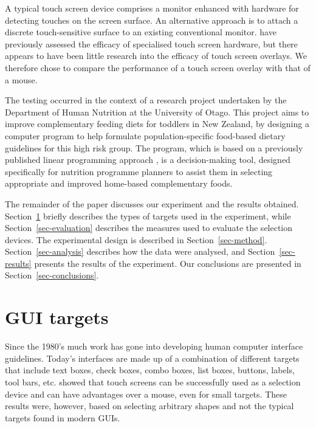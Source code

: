 \documentclass[a4paper]{article}
\begin{document}
A typical touch screen device comprises a monitor enhanced with hardware
for detecting touches on the screen surface. An alternative approach is
to attach a discrete touch-sensitive surface to an existing conventional
monitor. \citet{Sear-A-1991-IJMMS} have previously assessed the efficacy
of specialised touch screen hardware, but there appears to have been
little research into the efficacy of touch screen overlays. We therefore
chose to compare the performance of a touch screen overlay with that of
a mouse.

The testing occurred in the context of a research project undertaken by
the Department of Human Nutrition at the University of Otago. This
project aims to improve complementary feeding diets for toddlers in New
Zealand, by designing a computer program to help formulate
population-specific food-based dietary guidelines for this high risk
group. The program, which is based on a previously published linear
programming approach \citep{Ferg-EL-2004-Nutrition}, is a
decision-making tool, designed specifically for nutrition programme
planners to assist them in selecting appropriate and improved home-based
complementary foods.

The remainder of the paper discusses our experiment and the results
obtained. Section~\ref{sec-GUI} briefly describes the types of targets
used in the experiment, while Section~\ref{sec-evaluation} describes the
measures used to evaluate the selection devices. The experimental design
is described in Section~\ref{sec-method}. Section~\ref{sec-analysis}
describes how the data were analysed, and Section~\ref{sec-results}
presents the results of the experiment. Our conclusions are presented in
Section~\ref{sec-conclusions}.


\section{GUI targets}
\label{sec-GUI}

Since the 1980's much work has gone into developing human computer
interface guidelines. Today's interfaces are made up of a combination of
different targets that include text boxes, check boxes, combo boxes,
list boxes, buttons, labels, tool bars, etc. \citet{Sear-A-1991-IJMMS}
showed that touch screens can be successfully used as a selection device
and can have advantages over a mouse, even for small targets. These
results were, however, based on selecting arbitrary shapes and not the
typical targets found in modern GUIs.
\end{document}
